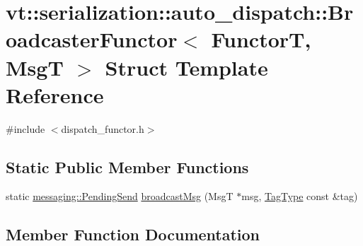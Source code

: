 \hypertarget{structvt_1_1serialization_1_1auto__dispatch_1_1_broadcaster_functor}{}\section{vt\+:\+:serialization\+:\+:auto\+\_\+dispatch\+:\+:Broadcaster\+Functor$<$ FunctorT, MsgT $>$ Struct Template Reference}
\label{structvt_1_1serialization_1_1auto__dispatch_1_1_broadcaster_functor}


{\ttfamily \#include $<$dispatch\+\_\+functor.\+h$>$}

\subsection*{Static Public Member Functions}
\begin{DoxyCompactItemize}
\item 
static \hyperlink{structvt_1_1messaging_1_1_pending_send}{messaging\+::\+Pending\+Send} \hyperlink{structvt_1_1serialization_1_1auto__dispatch_1_1_broadcaster_functor_a206fce5a607ce7c52cd75de3e35172f0}{broadcast\+Msg} (MsgT $\ast$msg, \hyperlink{namespacevt_a84ab281dae04a52a4b243d6bf62d0e52}{Tag\+Type} const \&tag)
\end{DoxyCompactItemize}


\subsection{Member Function Documentation}
\mbox{\label{structvt_1_1serialization_1_1auto__dispatch_1_1_broadcaster_functor_a206fce5a607ce7c52cd75de3e35172f0}} 
